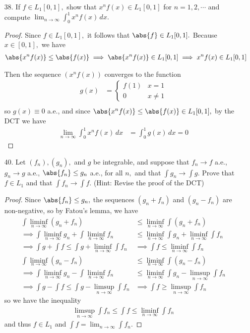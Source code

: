 \documentclass{article}
\begin{document}
\begin{itemize}
	\item[38.] If $f\in L_1[0, 1],$ show that $x^n f(x)\in L_1[0, 1]$ for $n=1, 2,\cdots$ and compute $\lim_{n\to\infty} \int_0^1 x^n f(x)\, dx.$
		\begin{proof}
			Since $f\in L_1[0, 1],$ it follows that $\abs{f}\in L_1[0, 1].$ Because $x\in [0, 1],$ we have
			\begin{align*}
				\abs{x^n f(x)} &\le \abs{f(x)} \implies \abs{x^n f(x)}\in L_1[0, 1]\implies x^n f(x)\in L_1[0, 1]
			\end{align*}

			Then the sequence $(x^n f(x))$ converges to the function
			\begin{align*}
				g(x) &= \begin{cases}
					f(1) & x = 1 \\
					0 & x\neq 1
				\end{cases} \\
			\end{align*}
			so $g(x)\equiv0$ a.e., and since $\abs{x^n f(x)}\le \abs{f(x)}\in L_1[0, 1],$ by the DCT we have
			\begin{align*}
				\lim_{n\to\infty} \int_0^1 x^n f(x)\, dx &= \int_0^1 g(x)\, dx = 0
			\end{align*}
		\end{proof}

	\item[40.] Let $(f_n), (g_n),$ and $g$ be integrable, and suppose that $f_n\to f$ a.e., $g_n\to g$ a.e., $\abs{f_n}\le g_n$ a.e., for all $n,$ and that $\int g_n\to \int g.$ Prove that $f\in L_1$ and that $\int f_n\to \int f.$ (Hint: Revise the proof of the DCT)
		\begin{proof}
			Since $\abs{f_n}\le g_n,$ the sequences $(g_n+f_n)$ and $(g_n-f_n)$ are non-negative, so by Fatou's lemma, we have
			\begin{align*}
				\int\liminf_{n\to\infty} (g_n+f_n) &\le \liminf_{n\to\infty} \int (g_n+f_n) \\
				\implies \int\liminf_{n\to\infty} g_n + \int\liminf_{n\to\infty} f_n &\le \liminf_{n\to\infty} \int g_n + \liminf_{n\to\infty} \int f_n \\
				\implies \int g + \int f \le \int g + \liminf_{n\to\infty} \int f_n &\implies \int f\le \liminf_{n\to\infty} \int f_n \\
				\int\liminf_{n\to\infty} (g_n-f_n) &\le \liminf_{n\to\infty}\int(g_n-f_n) \\
				\implies \int\liminf_{n\to\infty} g_n - \int\liminf_{n\to\infty} f_n &\le \liminf_{n\to\infty} \int g_n - \limsup_{n\to\infty}\int f_n \\
				\implies \int g - \int f \le \int g - \limsup_{n\to\infty} \int f_n &\implies \int f\ge\limsup_{n\to\infty} \int f_n
			\end{align*}
			so we have the inequality
			\begin{align*}
				\limsup_{n\to\infty} \int f_n\le \int f\le \liminf_{n\to\infty} \int f_n
			\end{align*}
			and thus $f\in L_1$ and $\int f = \lim_{n\to\infty} \int f_n.$
		\end{proof}


\end{itemize}
\end{document}
